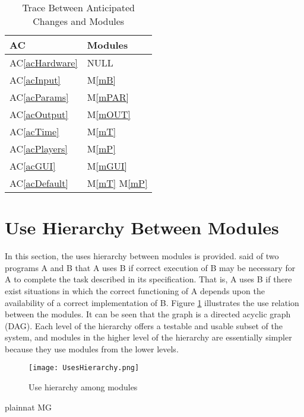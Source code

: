\documentclass[12pt, titlepage]{article}
\newcommand{\acref}[1]{AC\ref{#1}}
\newcommand{\mref}[1]{M\ref{#1}}
\begin{document}
\begin{table}[H]
\centering
\begin{tabular}{p{} p{}}
\toprule
\textbf{AC} & \textbf{Modules}\\
\midrule

\acref{acHardware} & NULL\\
\acref{acInput} & \mref{mB}\\
\acref{acParams} & \mref{mPAR}\\
\acref{acOutput} & \mref{mOUT}\\
\acref{acTime} & \mref{mT}\\
\acref{acPlayers} & \mref{mP}\\
\acref{acGUI} & \mref{mGUI}\\
\acref{acDefault} & \mref{mT} \mref{mP}\\

\bottomrule
\end{tabular}
\textcolor{red}{\caption{Trace Between Anticipated Changes and Modules}}
\label{TblACT}
\end{table}

\section{Use Hierarchy Between Modules} \label{SecUse}

In this section, the uses hierarchy between modules is
provided. \citet{Parnas1978} said of two programs A and B that A uses B if
correct execution of B may be necessary for A to complete the task described in
its specification. That is, A uses B if there exist situations in which
the correct functioning of A depends upon the availability of a correct
implementation of B.  Figure \ref{FigUH} illustrates the use relation between
the modules. It can be seen that the graph is a directed acyclic graph
(DAG). Each level of the hierarchy offers a testable and usable subset of the
system, and modules in the higher level of the hierarchy are essentially simpler
because they use modules from the lower levels.

\begin{figure}[H]
\centering
\texttt{[image: UsesHierarchy.png]}
\textcolor{red}{\caption{Use hierarchy among modules}}
\label{FigUH}
\end{figure}


 {plainnat}
 {MG}
\end{document}
